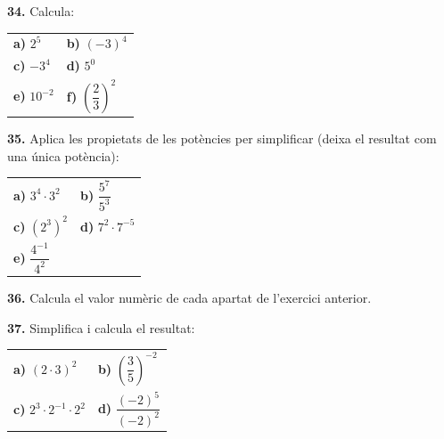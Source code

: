 \documentclass[13pt,a4paper]{extarticle}
\begin{document}
\par\noindent\begin{minipage}{\linewidth}
\textbf{34.} Calcula:\par

\begin{tabular}{@{}p{.46\linewidth}p{.46\linewidth}@{}}
\textbf{a)} $2^5$ & \textbf{b)} $\left(-3\right)^4$ \\[2pt]
\textbf{c)} $-3^4$ & \textbf{d)} $5^0$ \\[2pt]
\textbf{e)} $10^{-2}$ & \textbf{f)} $\left(\dfrac{2}{3}\right)^2$ \\[2pt]
\end{tabular}\par
\end{minipage}\par\vspace{1.6mm}
\par\noindent\begin{minipage}{\linewidth}
\textbf{35.} Aplica les propietats de les potències per simplificar (deixa el resultat com una única potència):\par

\begin{tabular}{@{}p{.46\linewidth}p{.46\linewidth}@{}}
\textbf{a)} $3^4\cdot 3^2$ & \textbf{b)} $\dfrac{5^7}{5^3}$ \\[2pt]
\textbf{c)} $\left(2^3\right)^2$ & \textbf{d)} $7^2\cdot 7^{-5}$ \\[2pt]
\textbf{e)} $\dfrac{4^{-1}}{4^{2}}$ &  \\[2pt]
\end{tabular}\par
\end{minipage}\par\vspace{1.6mm}
\par\noindent\begin{minipage}{\linewidth}
\textbf{36.} Calcula el valor numèric de cada apartat de l'exercici anterior.\par
\end{minipage}\par\vspace{1.6mm}
\par\noindent\begin{minipage}{\linewidth}
\textbf{37.} Simplifica i calcula el resultat:\par

\begin{tabular}{@{}p{.46\linewidth}p{.46\linewidth}@{}}
\textbf{a)} $\left(2\cdot 3\right)^2$ & \textbf{b)} $\left(\dfrac{3}{5}\right)^{-2}$ \\[2pt]
\textbf{c)} $2^3\cdot 2^{-1}\cdot 2^2$ & \textbf{d)} $\dfrac{\left(-2\right)^5}{\left(-2\right)^2}$ \\[2pt]
\end{tabular}\par
\end{minipage}\par\vspace{1.6mm}
\end{document}
